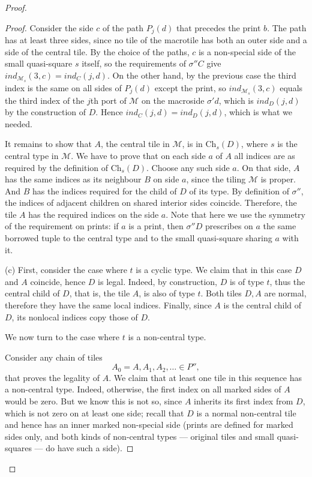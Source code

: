 \documentclass[10pt,a4paper]{amsart}
\newcommand{\cld}{\text{Ch}}
\newcommand{\ind}{\textit{ind}}
\begin{document}
\begin{proof}
\begin{proof}
Consider the side $c$ of the path $P_j(d)$ that precedes the print $b$. The path has at least
three sides, since no tile of the macrotile has both an outer side and a side of the central tile.
By the choice of the paths, $c$ is a non-special side of the small quasi-square $s$ itself, so the
requirements of $\sigma''C$ give $\ind_{\mathcal M_s}(3,c)=\ind_C(j,d)$. On the other hand, by the
previous case the third index is the same on all sides of $P_j(d)$ except the print, so
$\ind_{\mathcal M_s}(3,c)$ equals the third index of the $j$th port of $\mathcal M$ on the
macroside $\sigma'd$, which is $\ind_D(j,d)$ by the construction of $D$. Hence
$\ind_C(j,d)=\ind_D(j,d)$, which is what we needed.




   It remains to show that $A$, the central tile in $\mathcal M$, is in  $\cld_s(D)$, where
   $s$ is the central type in $\mathcal M$. 
     We have to prove that on each side $a$ of $A$ all
    indices are as required by the definition of $\cld_s(D)$. Choose any such side $a$.
    On that side, $A$ has the same indices as its neighbour $B$ on side $a$,
    since the tiling $\mathcal{M}$ is proper.
    And $B$  has the indices required for the child of $D$ of its type.
    By definition of $\sigma''$,  the indices of adjacent children on shared interior sides coincide.
    Therefore, the tile $A$ has the required indices on the side $a$. Note that here we use the
    symmetry of the requirement on prints: if $a$ is a print, then $\sigma''D$ prescribes on $a$
    the same borrowed tuple to the central type and to the small quasi-square sharing $a$ with it.

    (c) 
First, consider the case where $t$ is a cyclic type. We
claim that in this case $D$ and $A$ coincide, hence $D$ is legal.
Indeed, by construction, $D$ is of type $t$, thus the central child of $D$,
that is, the tile $A$, is also of type $t$. Both tiles $D,A$ are normal, therefore 
they have the same local indices. Finally, since $A$ is 
the central child of $D$,
its nonlocal indices copy those of $D$.

We now turn to the case where $t$ is a non-central type.

Consider any chain of tiles
$$
A_0=A,A_1,A_2,\dots\in P'',
$$
that proves the legality of $A$.
We claim that at least one tile in this sequence has a non-central type.
Indeed, otherwise, the first index on all marked sides of $A$ would be zero.
But we know this is not so, since $A$ inherits its first index from $D$,
which is not zero on at least one side; recall that $D$ is a normal non-central tile
and hence has an inner marked non-special side (prints are defined for marked sides only, and both
kinds of non-central types --- original tiles and small quasi-squares --- do have such a side).


\end{proof}
\end{proof}
\end{document}
